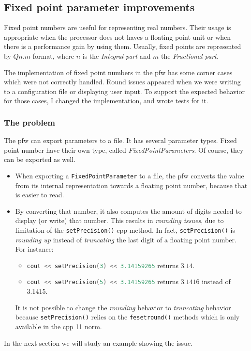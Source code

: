 \subsection{Fixed point parameter improvements}
Fixed point numbers are useful for representing real numbers. Their
usage is appropriate when the processor does not haves a floating point unit
or when there is a performance gain by using them. Usually, fixed points are
represented by $Qn.m$ format, where $n$ is the \emph{Integral part} and $m$ the
\emph{Fractional part}.

The implementation of fixed point numbers in the \gls{pfw} has some
corner cases which were not correctly handled. Round issues appeared when we
were writing to a configuration file or displaying user input. To
support the expected behavior for those cases, I changed the implementation, and
wrote tests for it.

\subsubsection{The problem}
The \gls{pfw} can export parameters to a file. It has several parameter types.
Fixed point number have their own type, called \emph{FixedPointParameters}. Of course, they can be exported as well.
\begin{itemize}
    \item When exporting a \lstinline{FixedPointParameter} to a file, the \gls{pfw} converts the value from
        its internal representation towards a floating point number, because that is
        easier to read.
    \item By converting that number, it also computes the amount of digits needed to display (or write) that number.
        This results in \emph{rounding issues}, due to limitation of the \lstinline{setPrecision()} \gls{cpp} method.
        In fact, \lstinline{setPrecision()} is \emph{rounding up} instead of \emph{truncating} the last digit of a floating point number.
        For instance:
        \begin{itemize}
            \item \lstinline[language=C++]{cout << setPrecision(3) << 3.14159265} returns $3.14$.
            \item \lstinline[language=C++]{cout << setPrecision(5) << 3.14159265} returns $3.1416$ instead of $3.1415$.
        \end{itemize}
        It is not possible to change the \emph{rounding} behavior to \emph{truncating} behavior because
        \lstinline{setPrecision()} relies on the \lstinline{fesetround()} methods which is only available in the \gls{cpp} 11 norm.
\end{itemize}
In the next section we will study an example showing the issue.

